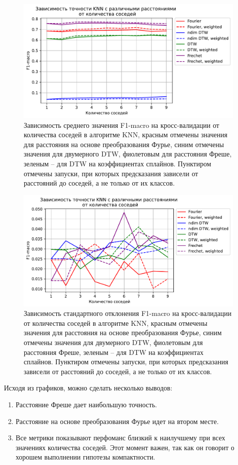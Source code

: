 \documentclass{article}
\begin{document}
\begin{figure}[H]
\centering
    \includegraphics[width=0.6\linewidth]{img/experiment_mean.pdf}
    \caption{Зависимость среднего значения F1-macro на кросс-валидации от количества соседей в алгоритме KNN, красным отмечены значения для расстояния на основе преобразования Фурье, синим отмечены значения для двумерного DTW, фиолетовым для расстояния Фреше, зеленым -- для DTW на коэффициентах сплайнов. Пунктиром отмечены запуски, при которых предсказания зависели от расстояний до соседей, а не только от их классов.}
    \label{fig:experiment_mean}
\end{figure}

\begin{figure}[H]
\centering
    \includegraphics[width=0.6\linewidth]{img/experiment_std.pdf}
    \caption{Зависимость стандартного отклонения F1-macro на кросс-валидации от количества соседей в алгоритме KNN, красным отмечены значения для расстояния на основе преобразования Фурье, синим отмечены значения для двумерного DTW, фиолетовым для расстояния Фреше, зеленым -- для DTW на коэффициентах сплайнов. Пунктиром отмечены запуски, при которых предсказания зависели от расстояний до соседей, а не только от их классов.}
    \label{fig:experiment_std}
\end{figure}

Исходя из графиков, можно сделать несколько выводов:
\begin{enumerate}
    \item Расстояние Фреше дает наибольшую точность.
    \item Расстояние на основе преобразования Фурье идет на втором месте.
    \item Все метрики показывают перфоманс близкий к наилучшему при всех значениях количества соседей. Этот момент важен, так как он говорит о хорошем выполнении гипотезы компактности.
\end{enumerate}
\end{document}
